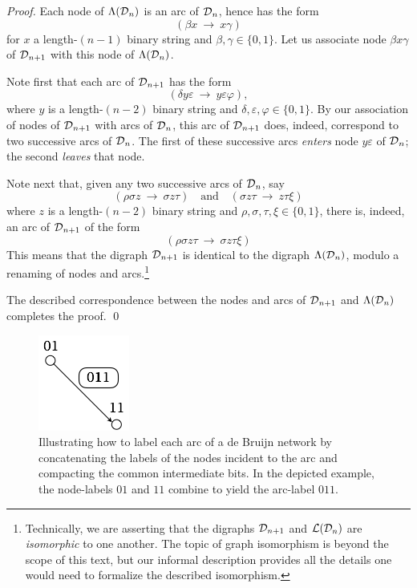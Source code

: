 \begin{proof}
Each node of $\Lambda(\mbox{$\cal D$}_n)$ is an arc of $\mbox{$\cal D$}_n$, hence has the form
\[ (\beta x \ \rightarrow \ x \gamma) \]
for $x$ a length-$(n-1)$ binary string and $\beta, \gamma \in
\{0,1\}$.  Let us associate node $\beta x \gamma$ of $\mbox{$\cal D$}_{n+1}$ with
this node of $\Lambda(\mbox{$\cal D$}_n)$.

\smallskip

Note first that each arc of $\mbox{$\cal D$}_{n+1}$ has the form
\[ (\delta y \varepsilon \ \rightarrow \ y \varepsilon \varphi), \]
where $y$ is a length-$(n-2)$ binary string and $\delta, \varepsilon,
\varphi \in \{0,1\}$.  By our association of nodes of $\mbox{$\cal D$}_{n+1}$ with
arcs of $\mbox{$\cal D$}_n$, this arc of $\mbox{$\cal D$}_{n+1}$ does, indeed, correspond to two
successive arcs of $\mbox{$\cal D$}_n$.   The first of these successive arcs
{\em enters} node $y \varepsilon$ of $\mbox{$\cal D$}_n$; the second {\em leaves}
that node.

Note next that, given any two successive arcs of $\mbox{$\cal D$}_n$, say
\[
(\rho \sigma z \ \rightarrow \ \sigma z \tau) \ \ \ \mbox { and } \ \ \
(\sigma z \tau \ \rightarrow \  z \tau \xi)
\]
where $z$ is a length-$(n-2)$ binary string and $\rho, \sigma, \tau,
\xi \in \{0,1\}$, there is, indeed, an arc of $\mbox{$\cal D$}_{n+1}$ of the form
\[ (\rho \sigma z \tau \ \rightarrow \ \sigma z \tau \xi) \]
This means that the digraph $\mbox{$\cal D$}_{n+1}$ is identical to the digraph
$\Lambda(\mbox{$\cal D$}_n)$, modulo a renaming of nodes and arcs.\footnote{Technically,
  we are asserting that the digraphs ${\cal D}_{n+1}$ and ${\cal
    L}({\cal D}_n)$ are {\it isomorphic} to one another.  The topic of
  graph isomorphism is beyond the scope of this text, but our informal
  description provides all the details one would need to formalize the
  described isomorphism.}

The described correspondence between the nodes and arcs of $\mbox{$\cal D$}_{n+1}$
and $\Lambda(\mbox{$\cal D$}_n)$ completes the proof.  \qed
\end{proof}

\begin{figure}[hbt]
\begin{center}
       \includegraphics[scale=0.6]{FiguresGraph/dBlabelEdge}
\caption{Illustrating how to label each arc of a de Bruijn network by
  concatenating the labels of the nodes incident to the arc and
  compacting the common intermediate bits.  In the depicted example,
  the node-labels $01$ and $11$ combine to yield the arc-label $011$.}
  \label{fig:dBlabelEdge}
\end{center}
\end{figure}


